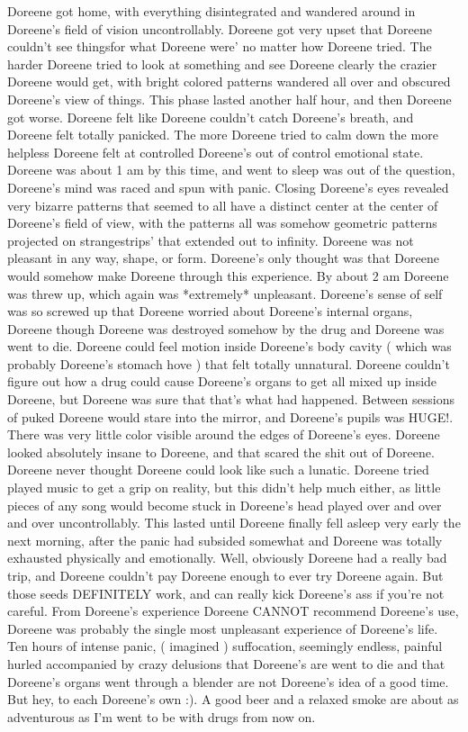\documentclass[12pt]{book}
\begin{document}
Doreene got home, with everything disintegrated and wandered around in Doreene's field of vision uncontrollably. Doreene got very upset that Doreene couldn't see thingsfor what Doreene were' no matter how Doreene tried. The harder Doreene tried to look at something and see Doreene clearly the crazier Doreene would get, with bright colored patterns wandered all over and obscured Doreene's view of things. This phase lasted another half hour, and then Doreene got worse. Doreene felt like Doreene couldn't catch Doreene's breath, and Doreene felt totally panicked. The more Doreene tried to calm down the more helpless Doreene felt at controlled Doreene's out of control emotional state. Doreene was about 1 am by this time, and went to sleep was out of the question, Doreene's mind was raced and spun with panic. Closing Doreene's eyes revealed very bizarre patterns that seemed to all have a distinct center at the center of Doreene's field of view, with the patterns all was somehow geometric patterns projected on strangestrips' that extended out to infinity. Doreene was not pleasant in any way, shape, or form. Doreene's only thought was that Doreene would somehow make Doreene through this experience. By about 2 am Doreene was threw up, which again was *extremely* unpleasant. Doreene's sense of self was so screwed up that Doreene worried about Doreene's internal organs, Doreene though Doreene was destroyed somehow by the drug and Doreene was went to die. Doreene could feel motion inside Doreene's body cavity ( which was probably Doreene's stomach hove ) that felt totally unnatural. Doreene couldn't figure out how a drug could cause Doreene's organs to get all mixed up inside Doreene, but Doreene was sure that that's what had happened. Between sessions of puked Doreene would stare into the mirror, and Doreene's pupils was HUGE!. There was very little color visible around the edges of Doreene's eyes. Doreene looked absolutely insane to Doreene, and that scared the shit out of Doreene. Doreene never thought Doreene could look like such a lunatic. Doreene tried played music to get a grip on reality, but this didn't help much either, as little pieces of any song would become stuck in Doreene's head played over and over and over uncontrollably. This lasted until Doreene finally fell asleep very early the next morning, after the panic had subsided somewhat and Doreene was totally exhausted physically and emotionally. Well, obviously Doreene had a really bad trip, and Doreene couldn't pay Doreene enough to ever try Doreene again. But those seeds DEFINITELY work, and can really kick Doreene's ass if you're not careful. From Doreene's experience Doreene CANNOT recommend Doreene's use, Doreene was probably the single most unpleasant experience of Doreene's life. Ten hours of intense panic, ( imagined ) suffocation, seemingly endless, painful hurled accompanied by crazy delusions that Doreene's are went to die and that Doreene's organs went through a blender are not Doreene's idea of a good time. But hey, to each Doreene's own :). A good beer and a relaxed smoke are about as adventurous as I'm went to be with drugs from now on.
\end{document}
